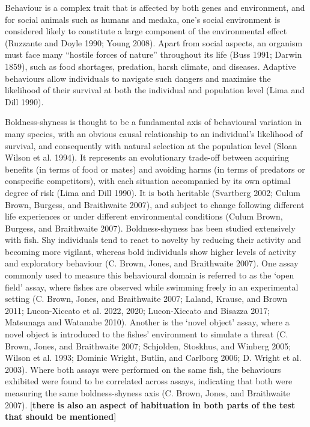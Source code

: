 \documentclass[
]{book}
\begin{document}
Behaviour is a complex trait that is affected by both genes and environment, and for social animals such as humans and medaka, one's social environment is considered likely to constitute a large component of the environmental effect (Ruzzante and Doyle 1990; Young 2008). Apart from social aspects, an organism must face many ``hostile forces of nature'' throughout its life (Buss 1991; Darwin 1859), such as food shortages, predation, harsh climate, and diseases. Adaptive behaviours allow individuals to navigate such dangers and maximise the likelihood of their survival at both the individual and population level (Lima and Dill 1990).

Boldness-shyness is thought to be a fundamental axis of behavioural variation in many species, with an obvious causal relationship to an individual's likelihood of survival, and consequently with natural selection at the population level (Sloan Wilson et al. 1994). It represents an evolutionary trade-off between acquiring benefits (in terms of food or mates) and avoiding harms (in terms of predators or conspecific competitors), with each situation accompanied by its own optimal degree of risk (Lima and Dill 1990). It is both heritable (Svartberg 2002; Culum Brown, Burgess, and Braithwaite 2007), and subject to change following different life experiences or under different environmental conditions (Culum Brown, Burgess, and Braithwaite 2007).
Boldness-shyness has been studied extensively with fish. Shy individuals tend to react to novelty by reducing their activity and becoming more vigilant, whereas bold individuals show higher levels of activity and exploratory behaviour (C. Brown, Jones, and Braithwaite 2007). One assay commonly used to measure this behavioural domain is referred to as the `open field' assay, where fishes are observed while swimming freely in an experimental setting (C. Brown, Jones, and Braithwaite 2007; Laland, Krause, and Brown 2011; Lucon-Xiccato et al. 2022, 2020; Lucon-Xiccato and Bisazza 2017; Matsunaga and Watanabe 2010). Another is the `novel object' assay, where a novel object is introduced to the fishes' environment to simulate a threat (C. Brown, Jones, and Braithwaite 2007; Schjolden, Stoskhus, and Winberg 2005; Wilson et al. 1993; Dominic Wright, Butlin, and Carlborg 2006; D. Wright et al. 2003). Where both assays were performed on the same fish, the behaviours exhibited were found to be correlated across assays, indicating that both were measuring the same boldness-shyness axis (C. Brown, Jones, and Braithwaite 2007). {[}\textbf{there is also an aspect of habituation in both parts of the test that should be mentioned}{]}
\end{document}
